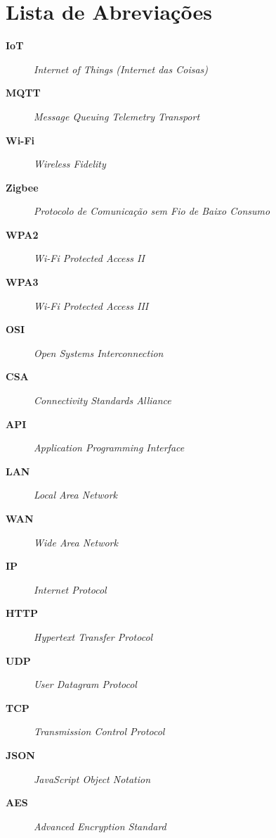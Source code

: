 \chapter*{Lista de Abreviações}

\begin{description}
    \item[\textbf{IoT}] \quad \textit{Internet of Things (Internet das Coisas)}
    \item[\textbf{MQTT}] \quad \textit{Message Queuing Telemetry Transport}
    \item[\textbf{Wi-Fi}] \quad \textit{Wireless Fidelity}
    \item[\textbf{Zigbee}] \quad \textit{Protocolo de Comunicação sem Fio de Baixo Consumo}
    \item[\textbf{WPA2}] \quad \textit{Wi-Fi Protected Access II}
    \item[\textbf{WPA3}] \quad \textit{Wi-Fi Protected Access III}
    \item[\textbf{OSI}] \quad \textit{Open Systems Interconnection}
    \item[\textbf{CSA}] \quad \textit{Connectivity Standards Alliance}
    \item[\textbf{API}] \quad \textit{Application Programming Interface}
    \item[\textbf{LAN}] \quad \textit{Local Area Network}
    \item[\textbf{WAN}] \quad \textit{Wide Area Network}
    \item[\textbf{IP}] \quad \textit{Internet Protocol}
    \item[\textbf{HTTP}] \quad \textit{Hypertext Transfer Protocol}
    \item[\textbf{UDP}] \quad \textit{User Datagram Protocol}
    \item[\textbf{TCP}] \quad \textit{Transmission Control Protocol}
    \item[\textbf{JSON}] \quad \textit{JavaScript Object Notation}
    \item[\textbf{AES}] \quad \textit{Advanced Encryption Standard}
\end{description}
